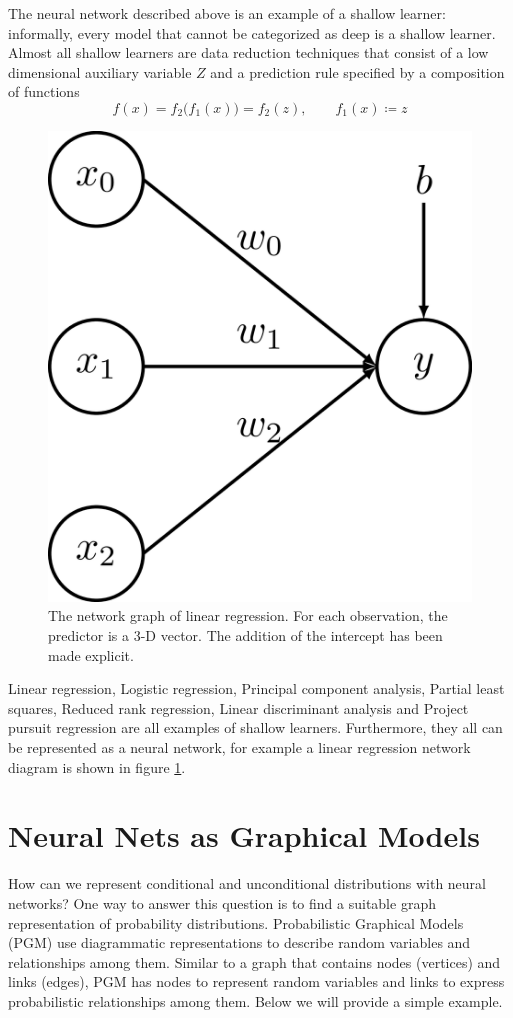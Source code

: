 The neural network described above is an example of a shallow learner: informally, every model that cannot be categorized as deep is a shallow learner. Almost all shallow learners are data reduction techniques that consist of a low dimensional auxiliary variable $Z$ and a prediction rule specified by a composition of functions
$$f(x) = f_2\big(f_1(x)\big) = f_2(z), \qquad f_1(x) \coloneqq z$$
\begin{figure}[ht]
    \centering
    \includegraphics[scale=0.06]{images/nn_lr.png}
    \caption{The network graph of linear regression. For each observation, the predictor is a 3-D vector. The addition of the intercept has been made explicit.}
    \label{fig:lr_neural_network}
\end{figure}
Linear regression, Logistic regression, Principal component analysis, Partial least squares, Reduced rank regression, Linear discriminant analysis and Project pursuit regression are all examples of shallow learners. Furthermore, they all can be represented as a neural network, for example a linear regression network diagram is shown in figure \ref{fig:lr_neural_network}.



\section{Neural Nets as Graphical Models}
How can we represent conditional and unconditional distributions with neural networks? One way to answer this question is to find a suitable graph representation of probability distributions. Probabilistic Graphical Models (PGM) use diagrammatic representations to describe random variables and relationships among them. Similar to a graph that contains nodes (vertices) and links (edges), PGM has nodes to represent random variables and links to express probabilistic relationships among them. Below we will provide a simple example.

